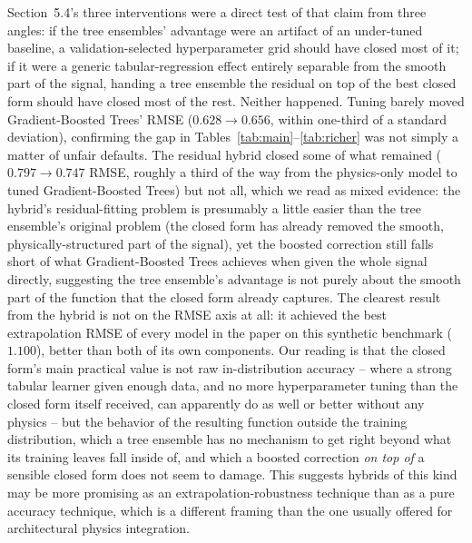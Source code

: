 \documentclass[11pt]{article}
\begin{document}
Section~5.4's three interventions were a direct test of that claim from three angles: if the tree ensembles' advantage were an artifact of an under-tuned baseline, a validation-selected hyperparameter grid should have closed most of it; if it were a generic tabular-regression effect entirely separable from the smooth part of the signal, handing a tree ensemble the residual on top of the best closed form should have closed most of the rest. Neither happened. Tuning barely moved Gradient-Boosted Trees' RMSE ($0.628 \to 0.656$, within one-third of a standard deviation), confirming the gap in Tables~\ref{tab:main}--\ref{tab:richer} was not simply a matter of unfair defaults. The residual hybrid closed some of what remained ($0.797 \to 0.747$ RMSE, roughly a third of the way from the physics-only model to tuned Gradient-Boosted Trees) but not all, which we read as mixed evidence: the hybrid's residual-fitting problem is presumably a little easier than the tree ensemble's original problem (the closed form has already removed the smooth, physically-structured part of the signal), yet the boosted correction still falls short of what Gradient-Boosted Trees achieves when given the whole signal directly, suggesting the tree ensemble's advantage is not purely about the smooth part of the function that the closed form already captures. The clearest result from the hybrid is not on the RMSE axis at all: it achieved the best extrapolation RMSE of every model in the paper on this synthetic benchmark ($1.100$), better than both of its own components. Our reading is that the closed form's main practical value is not raw in-distribution accuracy -- where a strong tabular learner given enough data, and no more hyperparameter tuning than the closed form itself received, can apparently do as well or better without any physics -- but the behavior of the resulting function outside the training distribution, which a tree ensemble has no mechanism to get right beyond what its training leaves fall inside of, and which a boosted correction \emph{on top of} a sensible closed form does not seem to damage. This suggests hybrids of this kind may be more promising as an extrapolation-robustness technique than as a pure accuracy technique, which is a different framing than the one usually offered for architectural physics integration.
\end{document}
